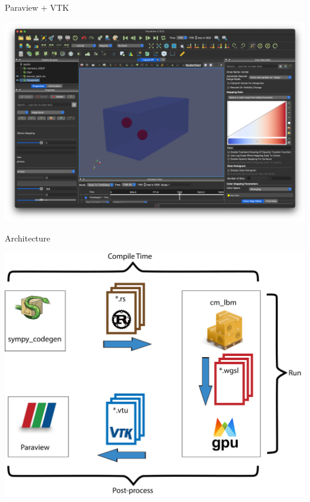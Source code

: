 \begin{frame}{Paraview + VTK}
\begin{center}
\centering
\includegraphics[width=0.7\linewidth]{example_1_paraview.png}
\end{center}
\end{frame}

\begin{frame}{Architecture}
  \begin{center}
  \centering
  \includegraphics[width=0.7\linewidth]{workflow.png}
  \end{center}
\end{frame}
